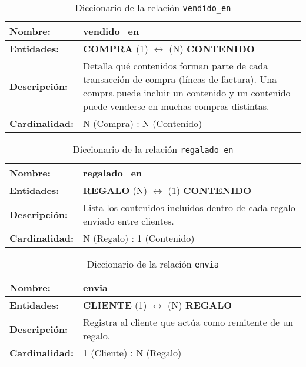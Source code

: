 \begin{longtable}{|p{3.5cm}|p{10cm}|}
\caption{Diccionario de la relación \texttt{vendido\_en}}
\label{tab:rel_vendido_en} \\ \hline
\textbf{Nombre:} & vendido\_en \\ \hline
\textbf{Entidades:} & \textbf{COMPRA} (1) $\longleftrightarrow$ (N) \textbf{CONTENIDO} \\ \hline
\textbf{Descripción:} & Detalla qué contenidos forman parte de cada transacción de compra (líneas de factura).  
Una compra puede incluir un contenido y un contenido puede venderse en muchas compras distintas. \\ \hline
\textbf{Cardinalidad:} & N (Compra) : N (Contenido) \\ \hline
\end{longtable}

\begin{longtable}{|p{3.5cm}|p{10cm}|}
\caption{Diccionario de la relación \texttt{regalado\_en}}
\label{tab:rel_regalado_en} \\ \hline
\textbf{Nombre:} & regalado\_en \\ \hline
\textbf{Entidades:} & \textbf{REGALO} (N) $\longleftrightarrow$ (1) \textbf{CONTENIDO} \\ \hline
\textbf{Descripción:} & Lista los contenidos incluidos dentro de cada regalo enviado entre clientes. \\ \hline
\textbf{Cardinalidad:} & N (Regalo) : 1 (Contenido) \\ \hline
\end{longtable}

\newpage
\begin{longtable}{|p{3.5cm}|p{10cm}|}
\caption{Diccionario de la relación \texttt{envia}}
\label{tab:rel_envia} \\ \hline
\textbf{Nombre:} & envia \\ \hline
\textbf{Entidades:} & \textbf{CLIENTE} (1) $\longleftrightarrow$ (N) \textbf{REGALO} \\ \hline
\textbf{Descripción:} & Registra al cliente que actúa como remitente de un regalo. \\ \hline
\textbf{Cardinalidad:} & 1 (Cliente) : N (Regalo) \\ \hline
\end{longtable}

